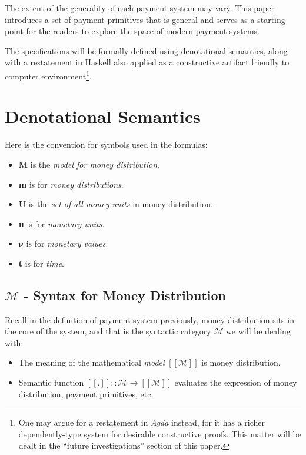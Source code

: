 The extent of the generality of each payment system may vary. This paper introduces a set of payment
primitives that is general and serves as a starting point for the readers to explore the space of
modern payment systems.

The specifications will be formally defined using denotational semantics, along with a restatement
in Haskell also applied as a constructive artifact friendly to computer environment\footnote{One may
argue for a restatement in \textit{Agda} instead, for it has a richer dependently-type system for
desirable constructive proofs. This matter will be dealt in the ``future investigations'' section of
this paper.}.

\section{Denotational Semantics}

Here is the convention for symbols used in the formulas:

\begin{itemize}
\item \textbf{M} is the \textit{model for money distribution}.
\item \textbf{m} is for \textit{money distributions}.
\item \textbf{U} is the \textit{set of all money units} in money distribution.
\item \textbf{u} is for \textit{monetary units}.
\item $\boldsymbol{\nu}$ is for \textit{monetary values}.
\item \textbf{t} is for \textit{time}.
\end{itemize}

\subsection{$\mathcal{M}$ - Syntax for Money Distribution}

Recall in the definition of payment system previously, money distribution sits in the core of the
system, and that is the syntactic category $\mathcal{M}$ we will be dealing with:

\begin{itemize}
    \item The meaning of the mathematical \textit{model} $[\![\mathcal{M}]\!]$ is money distribution.

    \item Semantic function $[\![.]\!] :: \mathcal{M} \rightarrow [\![\mathcal{M}]\!] $ evaluates
the expression of money distribution, payment primitives, etc.
\end{itemize}

